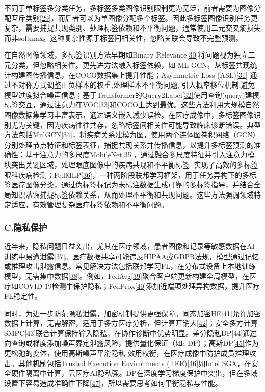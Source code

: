 不同于单标签多分类任务，多标签多类图像识别限制更为宽泛，前者需要为图像分配互斥类别\hyperref[_Ref213949872]{{[}29{]}}，而后者可以为单图像分配多个标签。因此多标签图像识别任务更复杂，需要捕捉共现类别、处理标签依赖和不平衡问题，通常使用二元交叉熵损失而非softmax。这种复杂性源于标签间相关性，忽略关联会导致不完整预测。

在自然图像领域，多标签识别方法早期如Binary Relevance\hyperref[_Ref213949896]{{[}30{]}}将问题视为独立二元分类，但忽略相关性。更先进方法融入标签依赖，如 ML-GCN，从标签共现统计构建图传播信息，在COCO数据集上提升性能；Asymmetric Loss (ASL)\hyperref[_Ref213949927]{{[}31{]}} 通过不对称方式调整正负样本的权重,处理样本不平衡问题, 引入概率移位机制,避免模型过度拟合噪声信息；基于Transformer的Query2Label\hyperref[_Ref213950246]{{[}32{]}}使用查询(query)建模标签交互，通过注意力在VOC\hyperref[_Ref213950282]{{[}33{]}}和COCO上达到最优。这些方法利用大规模自然图像数据集学习丰富表示，通过语义嵌入减少误检。在医疗成像中，多标签图像识别尤为关键，因为疾病往往共存，忽略标签间相关性可能导致临床诊断错误。典型方法包括MulGCN\hyperref[_Ref213950338]{{[}34{]}}，将疾病关系建模为图，使用两个连体图卷积网络（GCN）分别处理节点特征和标签表征，捕捉共现关系并传播信息，以提升多标签预测的准确性；基于注意力的多尺度MobileNet\hyperref[_Ref213950343]{{[}35{]}}，通过融合多尺度特征并引入注意力模块突出关键区域，处理眼底图像中的疾病共现和不平衡标签. 实现了高效的多标签眼科疾病检测；FedMLP\hyperref[_Ref213950349]{{[}36{]}}，一种两阶段联邦学习框架，用于任务异构下的多标签医疗图像分类，通过伪标签标记为未标注数据生成可靠的多标签指导，并结合全局知识蒸馏捕捉标签依赖关系，从而处理不平衡和共现问题。这些方法强调领域特定适应，有效管理复杂医疗标签依赖和不平衡问题。

\subsubsection{C.隐私保护}\label{c.ux9690ux79c1ux4fddux62a4}

近年来，隐私问题日益突出，尤其在医疗领域，患者图像和记录等敏感数据在AI训练中易遭泄露\hyperref[_Ref213950358]{{[}37{]}}。医疗数据共享可能违反HIPAA或GDPR法规，模型通过记忆或推理攻击泄露信息。常见解决方法包括联邦学习FL，在分布式设备上本地训练模型，无需集中数据\hyperref[_Ref213950376]{{[}38{]}}。例如，FedAvg\hyperref[_Ref213950381]{{[}39{]}}聚合客户端更新构建全局模型，在医疗如COVID-19检测中保护隐私；FedProx\hyperref[_Ref213950391]{{[}40{]}}添加近端项处理异构数据，提升医疗FL稳定性。

同时，为进一步防范隐私泄露，加密机制提供更强保障。同态加密HE\hyperref[_Ref213950427]{{[}41{]}}允许加密数据上计算，无需解密，适用于多方医疗分析，但计算开销大\hyperref[_Ref213950433]{{[}42{]}}；安全多方计算SMPC\hyperref[_Ref213950438]{{[}43{]}}联合计算保持输入隐私，在协作诊断中优势明显。差分隐私DP\hyperref[_Ref213950443]{{[}44{]}}通过向查询或梯度添加噪声界定泄露风险，提供量化保证（如\(\epsilon\)-DP）；高斯DP\hyperref[_Ref213950449]{{[}45{]}}作为更松弛的变体，使用高斯噪声平滑隐私-效用权衡，在医疗成像中防护成员推理攻击。其他机制包括Trusted Execution Environments (TEE)\hyperref[_Ref213950453]{{[}46{]}}如Intel SGX，在安全硬件隔离中计算，云医疗AI隐私强。DP在深度学习梯度保护中突出，但在多域设置下容易造成准确性下降\hyperref[_Ref213950458]{{[}47{]}}，所以需要思考如何平衡隐私与性能。


